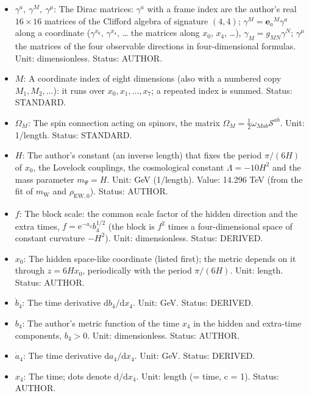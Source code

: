 \documentclass[
  10pt,
]{article}
\providecommand{\tightlist}{%
  \setlength{\itemsep}{0pt}\setlength{\parskip}{0pt}}
\begin{document}
\begin{itemize}
\tightlist
\item
  \(\gamma^a,\ \gamma^M,\ \gamma^\mu\): The Dirac matrices: \(\gamma^a\)
  with a frame index are the author's real \(16 \times 16\) matrices of
  the Clifford algebra of signature \((4, 4)\);
  \(\gamma^M = \mathbf{e}_a{}^M\gamma^a\) along a coordinate
  (\(\gamma^{x_0}\), \(\gamma^{x_4}\), \ldots{} the matrices along
  \(x_0\), \(x_4\), \ldots), \(\gamma_M = g_{MN}\gamma^N\);
  \(\gamma^\mu\) the matrices of the four observable directions in
  four-dimensional formulas. Unit: dimensionless. Status: AUTHOR.
\item
  \(M\): A coordinate index of eight dimensions (also with a numbered
  copy \(M_1, M_2, \dots\)): it runs over \(x_0, x_1, \dots, x_7\); a
  repeated index is summed. Status: STANDARD.
\item
  \(\Omega_M\): The spin connection acting on spinors, the matrix
  \(\Omega_M = \frac12\omega_{Mab}\mathcal{S}^{ab}\). Unit: 1/length.
  Status: STANDARD.
\item
  \(H\): The author's constant (an inverse length) that fixes the period
  \(\pi/(6H)\) of \(x_0\), the Lovelock couplings, the cosmological
  constant \(\Lambda = -10H^2\) and the mass parameter \(m_\Psi = H\).
  Unit: GeV (1/length). Value: 14.296 TeV (from the fit of
  \(m_{\mathrm{W}}\) and \(\rho_{\mathrm{EW},0}\)). Status: AUTHOR.
\item
  \(f\): The block scale: the common scale factor of the hidden
  direction and the extra times, \(f = \mathrm{e}^{-a_4}b_4^{1/2}\) (the
  block is \(f^2\) times a four-dimensional space of constant curvature
  \(-H^2\)). Unit: dimensionless. Status: DERIVED.
\item
  \(x_0\): The hidden space-like coordinate (listed first); the metric
  depends on it through \(z = 6Hx_0\), periodically with the period
  \(\pi/(6H)\). Unit: length. Status: AUTHOR.
\item
  \(\dot b_4\): The time derivative \(\mathrm{d}b_4/\mathrm{d}x_4\).
  Unit: GeV. Status: DERIVED.
\item
  \(b_4\): The author's metric function of the time \(x_4\) in the
  hidden and extra-time components, \(b_4 > 0\). Unit: dimensionless.
  Status: AUTHOR.
\item
  \(\dot a_4\): The time derivative \(\mathrm{d}a_4/\mathrm{d}x_4\).
  Unit: GeV. Status: DERIVED.
\item
  \(x_4\): The time; dots denote \(\mathrm{d}/\mathrm{d}x_4\). Unit:
  length (= time, c = 1). Status: AUTHOR.
\end{itemize}
\end{document}
